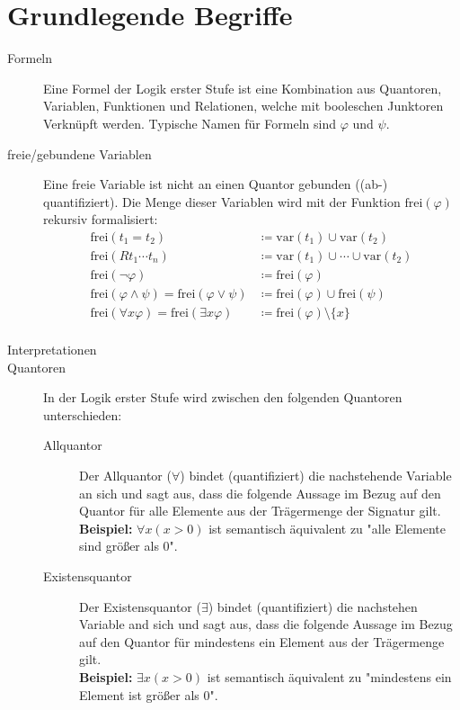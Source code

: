     \section{Grundlegende Begriffe}
        \begin{description}
            \item[Formeln] Eine Formel der Logik erster Stufe ist eine Kombination aus Quantoren, Variablen, Funktionen und Relationen, welche mit booleschen Junktoren Verknüpft werden. Typische Namen für Formeln sind $ \varphi $ und $ \psi $.
            \item[freie/gebundene Variablen] Eine freie Variable ist nicht an einen Quantor gebunden ((ab-) quantifiziert). Die Menge dieser Variablen wird mit der Funktion $ \text{frei}(\varphi) $ rekursiv formalisiert:
                \begin{align*}
                    \text{frei}(t _ 1 = t _ 2) &\coloneqq \text{var}(t _ 1) \cup \text{var}(t _ 2) \\
                    \text{frei}(R t _ 1 \cdots t _ n) &\coloneqq \text{var}(t _ 1) \cup \cdots \cup \text{var}(t _ 2) \\
                    \text{frei}(\lnot \varphi) &\coloneqq \text{frei}(\varphi) \\
                    \text{frei}(\varphi \land \psi) = \text{frei}(\varphi \lor \psi) &\coloneqq \text{frei}(\varphi) \cup \text{frei}(\psi) \\
                    \text{frei}(\forall x \varphi) = \text{frei}(\exists x \varphi) &\coloneqq \text{frei}(\varphi) \setminus \{ x \} \\
                \end{align*}
            \item[Interpretationen] 
            \item[Quantoren] In der Logik erster Stufe wird zwischen den folgenden Quantoren unterschieden:
                \begin{description}
                    \item[Allquantor] Der Allquantor ($ \forall $) bindet (quantifiziert) die nachstehende Variable an sich und sagt aus, dass die folgende Aussage im Bezug auf den Quantor für alle Elemente aus der Trägermenge der Signatur gilt. \\ \textbf{Beispiel:} $ \forall x (x > 0) $ ist semantisch äquivalent zu "alle Elemente sind größer als 0".
                    \item[Existensquantor] Der Existensquantor ($ \exists $) bindet (quantifiziert) die nachstehen Variable and sich und sagt aus, dass die folgende Aussage im Bezug auf den Quantor für mindestens ein Element aus der Trägermenge gilt. \\ \textbf{Beispiel:} $ \exists x (x > 0) $ ist semantisch äquivalent zu "mindestens ein Element ist größer als 0".

\end{description}
\end{description}
